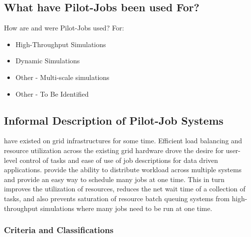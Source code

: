 \documentclass{sig-alternate}
\begin{document}
\subsection{What have Pilot-Jobs been used For?}

How are and were Pilot-Jobs used?
For:
\begin{itemize}
\item High-Throughput Simulations
\item Dynamic Simulations
\item Other - Multi-scale simulations  
\item Other - To Be Identified
\end{itemize}


\subsection{Informal Description of Pilot-Job Systems}

\pilotjobs have existed on grid infrastructures for some time. 
Efficient load balancing and resource utilization
across the existing grid hardware drove the desire for 
user-level control of tasks and ease of use of job descriptions for
data driven applications.  \pilotjobs provide the ability to 
distribute workload across multiple systems and
provide an easy way to schedule many jobs at one time. This in turn
improves the utilization of resources, reduces the net wait time of a
collection of tasks, and also prevents saturation of resource batch
queuing systems from high-throughput simulations where many jobs
need to be run at one time.

\subsubsection*{Criteria and Classifications}
\end{document}
